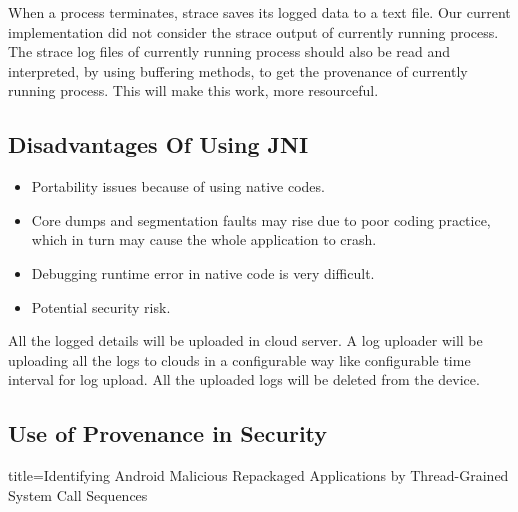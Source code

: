 When a process terminates, strace saves its logged data to a text
file.  Our current implementation did not consider the strace output
of currently running process.  The strace log files of currently
running process should also be read and interpreted, by using
buffering methods, to get the provenance of currently running process.
This will make this work, more resourceful.

\subsection{Disadvantages Of Using JNI}
\begin{itemize}
	\item Portability issues because of using native codes.
	\item Core dumps and segmentation faults may rise due to poor coding practice, which in turn may cause the whole application to crash.  
	\item Debugging runtime error in native code is very difficult.  
	\item Potential security risk.
\end{itemize}

All the logged details will be uploaded in cloud server.  A log
uploader will be uploading all the logs to clouds in a configurable
way like configurable time interval for log upload.  All the uploaded
logs will be deleted from the device.

\subsection{Use of Provenance in Security}

title={Identifying {Android} Malicious Repackaged Applications by
                  Thread-Grained System Call Sequences}
\citep{lin2013identifying}

